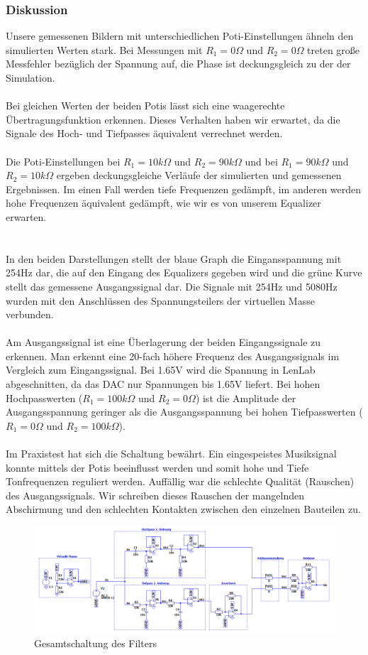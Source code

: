 \subsubsection{Diskussion}

Unsere gemessenen Bildern mit unterschiedlichen Poti-Einstellungen ähneln den simulierten Werten stark. Bei Messungen mit $R_1 = 0\Omega$ und $R_2 = 0\Omega$ treten große Messfehler bezüglich der Spannung auf, die Phase ist deckungsgleich zu der der Simulation.
\\
\\
Bei gleichen Werten der beiden Potis lässt sich eine waagerechte Übertragungsfunktion erkennen. Dieses Verhalten haben wir erwartet, da die Signale des Hoch- und Tiefpasses äquivalent verrechnet werden.
\\
\\
Die Poti-Einstellungen bei $R_1 = 10k\Omega$ und $R_2 = 90k\Omega$ und bei $R_1 = 90k\Omega$ und $R_2 = 10k\Omega$ ergeben deckungsgleiche Verläufe der simulierten und gemessenen Ergebnissen. Im einen Fall werden tiefe Frequenzen gedämpft, im anderen werden hohe Frequenzen äquivalent gedämpft, wie wir es von unserem Equalizer erwarten.
\\
\\
\\
In den beiden Darstellungen stellt der blaue Graph die Eingansspannung mit 254Hz dar, die auf den Eingang des Equalizers gegeben wird und die grüne Kurve stellt das gemessene Ausgangssignal dar. Die Signale mit 254Hz und 5080Hz wurden mit den Anschlüssen des Spannungsteilers der virtuellen Masse verbunden.
\\
\\
Am Ausgangssignal ist eine Überlagerung der beiden Eingangssignale zu erkennen. Man erkennt eine 20-fach höhere Frequenz des Ausgangssignals im Vergleich zum Eingangssignal. Bei 1.65V wird die Spannung in LenLab abgeschnitten, da das DAC nur Spannungen bis 1.65V liefert. Bei hohen Hochpasswerten ($R_{1} = 100k\Omega$ und $R_{2} = 0\Omega$) ist die Amplitude der Ausgangsspannung geringer als die Ausgangsspannung bei hohen Tiefpasswerten ($R_{1} = 0\Omega$ und $R_{2} = 100k\Omega$).
\\
\\
Im Praxistest hat sich die Schaltung bewährt. Ein eingespeistes Musiksignal konnte mittels der Potis beeinflusst werden und somit hohe und Tiefe Tonfrequenzen reguliert werden. Auffällig war die schlechte Qualität (Rauschen) des Ausgangssignals. Wir schreiben dieses Rauschen der mangelnden Abschirmung und den schlechten Kontakten zwischen den einzelnen Bauteilen zu.

\newpage
\begin{figure}
    \includegraphics[width=22cm]{./pictures/Schaltung}
    \caption{Gesamtschaltung des Filters}
    \label{fig:Gesamtschaltung}
\end{figure}